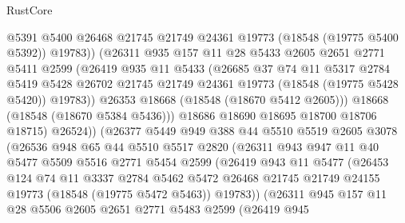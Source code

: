\begin{lexlean}{RustCore}
\begin{coremodule}
                    @5391
                    @5400
                    @26468
                    @21745
                    @21749
                    @24361
                    @19773
                    (@18548 (@19775 @5400 @5392))
                    @19783))
                (@26311
                  @935
                  @157
                  @11
                  @28
                  @5433
                  @2605
                  @2651
                  @2771
                  @5411
                  @2599
                  (@26419
                    @935
                    @11
                    @5433
                    (@26685
                      @37
                      @74
                      @11
                      @5317
                      @2784
                      @5419
                      @5428
                      @26702
                      @21745
                      @21749
                      @24361
                      @19773
                      (@18548 (@19775 @5428 @5420))
                      @19783))
                  @26353
                  @18668
                  (@18548 (@18670 @5412 @2605)))
                @18668
                (@18548 (@18670 @5384 @5436)))
              @18686
              @18690
              @18695
              @18700
              @18706
              @18715)
            @26524))
        (@26377
          @5449
          @949
          @388
          @44
          @5510
          @5519
          @2605
          @3078
          (@26536
            @948
            @65
            @44
            @5510
            @5517
            @2820
            (@26311
              @943
              @947
              @11
              @40
              @5477
              @5509
              @5516
              @2771
              @5454
              @2599
              (@26419
                @943
                @11
                @5477
                (@26453
                  @124
                  @74
                  @11
                  @3337
                  @2784
                  @5462
                  @5472
                  @26468
                  @21745
                  @21749
                  @24155
                  @19773
                  (@18548 (@19775 @5472 @5463))
                  @19783))
              (@26311
                @945
                @157
                @11
                @28
                @5506
                @2605
                @2651
                @2771
                @5483
                @2599
                (@26419
                  @945

\end{coremodule}
\end{lexlean}
